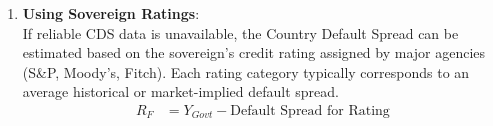 \begin{enumerate}
\begin{table}[H]
              \vspace{2mm}
              \raggedright \footnotesize
              \textit{Note:} Data reflects illustrative 10-year sovereign Credit Default Swap spreads as of March 2025. Spreads are highly dynamic and fluctuate based on macroeconomic conditions and perceived sovereign risk.\\
              \textit{Source:} Data retrieved from market aggregators.
          \end{table}

    \item \textbf{Using Sovereign Ratings}:\\
          If reliable CDS data is unavailable, the Country Default Spread can be estimated based on the sovereign's credit rating assigned by major agencies (S\&P, Moody's, Fitch). Each rating category typically corresponds to an average historical or market-implied default spread.
          \begin{align*}
              R_F & = Y_{Govt} - \text{Default Spread for Rating}
          \end{align*}


\end{enumerate}
